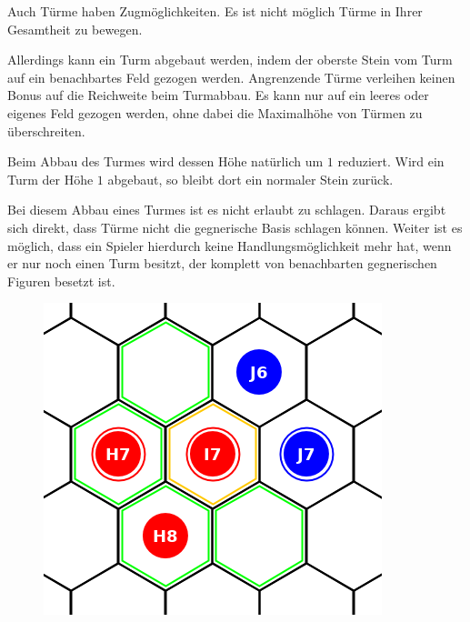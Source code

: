 \bigskip

Auch Türme haben Zugmöglichkeiten. Es ist nicht möglich Türme in Ihrer Gesamtheit zu bewegen. 

Allerdings kann ein Turm abgebaut werden, indem der oberste Stein vom Turm auf ein benachbartes Feld gezogen werden. Angrenzende Türme verleihen keinen Bonus auf die Reichweite beim Turmabbau. Es kann nur auf ein leeres oder eigenes Feld gezogen werden, ohne dabei die Maximalhöhe von Türmen zu überschreiten.

Beim Abbau des Turmes wird dessen Höhe natürlich um $1$ reduziert. Wird ein Turm der Höhe $1$ abgebaut, so bleibt dort ein normaler Stein zurück.

Bei diesem Abbau eines Turmes ist es nicht erlaubt zu schlagen. Daraus ergibt sich direkt, dass Türme nicht die gegnerische Basis schlagen können. Weiter ist es möglich, dass ein Spieler hierdurch keine Handlungsmöglichkeit mehr hat, wenn er nur noch einen Turm besitzt, der komplett von benachbarten gegnerischen Figuren besetzt ist. 

\begin{figure}[ht]
\begin{center}
\includegraphics[scale=0.25]{graphic/tower-move.png} \\
\end{center}
\end{figure}

